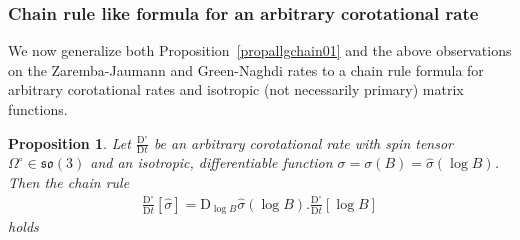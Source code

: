\documentclass[10pt]{article}
\newcounter{theoremCounter}
\numberwithin{theoremCounter}{section}
\theoremstyle{plain}
\newtheorem{prop}[theoremCounter]{Proposition}
\theoremstyle{definition}
\newcommand{\DD}{\mathrm{D}}
\numberwithin{equation}{section}
\begin{document}
\subsubsection{Chain rule like formula for an arbitrary corotational rate} \label{chainruleallg}
%
We now generalize both Proposition~\ref{propallgchain01} and the above observations on the Zaremba-Jaumann and Green-Naghdi rates to a chain rule formula for arbitrary corotational rates and isotropic (not necessarily primary) matrix functions.
\begin{prop} \label{apppropa20}
Let $\frac{\DD^{\circ}}{\DD t}$ be an arbitrary corotational rate with spin tensor $\Omega^{\circ} \in \mathfrak{so}(3)$ and an isotropic, differentiable function $\sigma = \sigma(B) = \widehat \sigma(\log B)$. Then the chain rule
	\begin{align}
	\frac{\DD^{\circ}}{\DD t}[\widehat \sigma] = \DD_{\log B} \widehat \sigma(\log B) . \frac{\DD^{\circ}}{\DD t}[\log B]
	\end{align}
holds
\end{prop}
%
\end{document}

